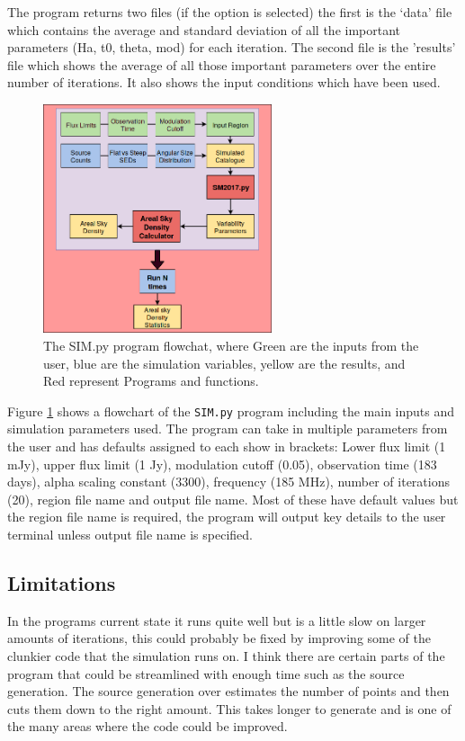 \documentclass[a4paper]{article}
\begin{document}
The program returns two files (if the option is selected) the first is the `data' file which contains the average and standard deviation of all the important parameters (Ha, t0, theta, mod)  for each iteration. The second file is the 'results' file which shows the average of all those important parameters over the entire number of iterations. It also shows the input conditions which have been used.\\
\begin{figure}[H]
    \centering
    \includegraphics[width=0.6\textwidth]{SIM3(1).png}
    \caption{The SIM.py program flowchat, where Green are the inputs from the user, blue are the simulation variables, yellow are the results, and Red represent Programs and functions.}
    \label{fig:SIM}
\end{figure}

Figure \ref{fig:SIM} shows a flowchart of the \texttt{SIM.py} program including the main inputs and simulation parameters used. The program can take in multiple parameters from the user and has defaults assigned to each show in brackets: Lower flux limit (1 mJy), upper flux limit (1 Jy), modulation cutoff (0.05), observation time (183 days), alpha scaling constant (3300), frequency (185 MHz), number of iterations (20), region file name and output file name. Most of these have default values but the region file name is required, the program will output key details to the user terminal unless output file name is specified.


\subsection{Limitations}
In the programs current state it runs quite well but is a little slow on larger amounts of iterations, this could probably be fixed by improving some of the clunkier code that the simulation runs on. I think there are certain parts of the program that could be streamlined with enough time such as the source generation. The source generation over estimates the number of points and then cuts them down to the right amount. This takes longer to generate and is one of the many areas where the code could be improved.\\
\end{document}
